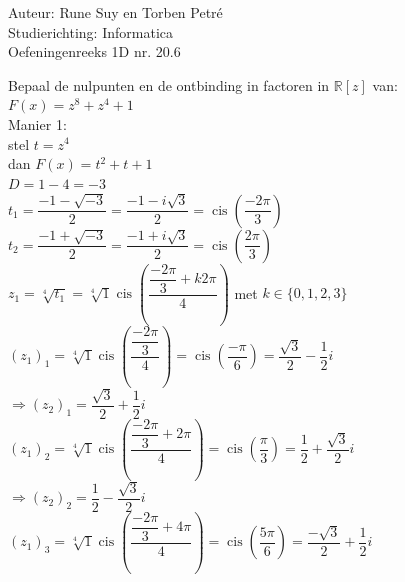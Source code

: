 \documentclass[a4paper]{article}
\newcommand{\cis}{\operatorname{cis}}
\begin{document}
  
\noindent \large Auteur: Rune Suy en Torben Petré \\
\noindent \large Studierichting: Informatica\\
\noindent \large Oefeningenreeks 1D nr. 20.6\\

\medskip

\normalsize

Bepaal de nulpunten en de ontbinding in factoren in $\mathbb{R}[z]$ van: \\

$F(x) = z^8 + z^4 + 1$\\

Manier 1:\\

stel $t = z^4$\\

dan $F(x) = t^2 + t + 1$\\

$D = 1- 4 = -3$\\

$t_1 =  \dfrac{-1 - \sqrt{-3}}{2} = \dfrac{-1 - i\sqrt{3}}{2} = \cis\left(\dfrac{-2\pi}{3}\right)$\\

$t_2 =  \dfrac{-1 + \sqrt{-3}}{2} = \dfrac{-1 + i\sqrt{3}}{2} = \cis\left(\dfrac{2\pi}{3}\right)$\\

$z_1 = \sqrt[4]{t_1} = \sqrt[4]{1} \cis\left(\dfrac{\dfrac{-2\pi}{3} + k2\pi}{4}\right)$ met $k \in \{0,1,2,3\}$\\

$(z_1)_1 = \sqrt[4]{1} \cis\left(\dfrac{\dfrac{-2\pi}{3}}{4}\right) = \cis\left(\dfrac{-\pi}{6}\right) = \dfrac{\sqrt{3}}{2} - \dfrac{1}{2}i$\\

$\Rightarrow (z_2)_1 = \dfrac{\sqrt{3}}{2} + \dfrac{1}{2}i$\\

$(z_1)_2 = \sqrt[4]{1} \cis\left(\dfrac{\dfrac{-2\pi}{3} + 2\pi}{4}\right) = \cis\left(\dfrac{\pi}{3}\right) = \dfrac{1}{2} + \dfrac{\sqrt{3}}{2}i$\\

$\Rightarrow (z_2)_2 = \dfrac{1}{2} - \dfrac{\sqrt{3}}{2}i$\\

$(z_1)_3 = \sqrt[4]{1} \cis\left(\dfrac{\dfrac{-2\pi}{3} + 4\pi}{4}\right) = \cis\left(\dfrac{5\pi}{6}\right) = \dfrac{-\sqrt{3}}{2} + \dfrac{1}{2}i$\\
\end{document}
